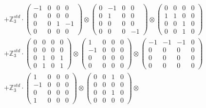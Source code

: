 \documentclass{article}
\begin{document}
{\begin{align}
        &+ \label{Rs1-Rc16-Solution-4-c4} \mathbb{Z}_3^{std} \cdot 
            \begin{pmatrix} -1 & 0 & 0 & 0 \\ 0 & 0 & 0 & 0 \\ 0 & 0 & 1 & -1 \\ 0 & 0 & 0 & 0 \end{pmatrix} \otimes 
            \begin{pmatrix} 0 & -1 & 0 & 0 \\ 0 & 1 & 0 & 0 \\ 0 & 0 & 0 & 0 \\ 0 & 0 & 0 & -1 \end{pmatrix} \otimes 
            \begin{pmatrix} 0 & 0 & 0 & 0 \\ 1 & 1 & 0 & 0 \\ 0 & 0 & 1 & 0 \\ 0 & 0 & 1 & 0 \end{pmatrix} \\ 
        &+ \label{Rs1-Rc16-Solution-4-c5} \mathbb{Z}_3^{std} \cdot 
            \begin{pmatrix} 0 & 0 & 0 & 0 \\ 0 & 0 & 0 & 0 \\ 0 & 1 & 0 & 1 \\ 0 & 1 & 0 & 1 \end{pmatrix} \otimes 
            \begin{pmatrix} 1 & 0 & 0 & 0 \\ -1 & 0 & 0 & 0 \\ 0 & 0 & 0 & 0 \\ 0 & 0 & 0 & 0 \end{pmatrix} \otimes 
            \begin{pmatrix} -1 & -1 & -1 & 0 \\ 0 & 0 & 0 & 0 \\ 0 & 0 & 0 & 0 \\ 0 & 0 & 0 & 0 \end{pmatrix} \\ 
        &+ \label{Rs1-Rc16-Solution-4-c6} \mathbb{Z}_3^{std} \cdot 
            \begin{pmatrix} 1 & 0 & 0 & 0 \\ -1 & 0 & 0 & 0 \\ 0 & 0 & 0 & 0 \\ 1 & 0 & 0 & 0 \end{pmatrix} \otimes 
            \begin{pmatrix} 0 & 0 & 1 & 0 \\ 0 & 0 & 0 & 0 \\ 0 & 0 & 1 & 0 \\ 0 & 0 & 0 & 0 \end{pmatrix} \otimes 

\end{align}}
\end{document}
